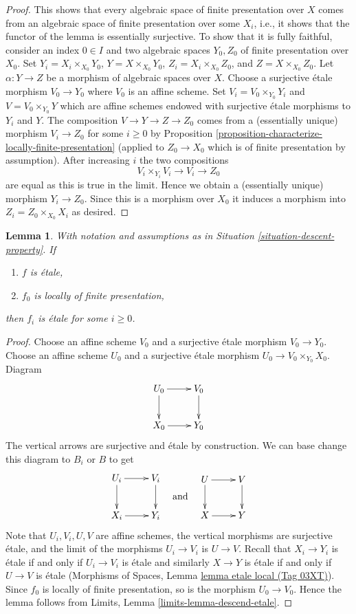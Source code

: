 \documentclass{amsart}
\theoremstyle{plain}
\newtheorem{lemma}[subsection]{Lemma}
\theoremstyle{definition}
\theoremstyle{remark}
\numberwithin{equation}{subsection}
\begin{document}
\begin{proof}
\medskip\noindent
This shows that every algebraic space of finite presentation over $X$ comes
from an algebraic space of finite presentation over some $X_i$, i.e.,
it shows that the functor of the lemma is essentially surjective. To
show that it is fully faithful, consider an index $0 \in I$ and two
algebraic spaces $Y_0, Z_0$ of finite presentation over $X_0$.
Set $Y_i = X_i \times_{X_0} Y_0$, $Y = X \times_{X_0} Y_0$,
$Z_i = X_i \times_{X_0} Z_0$, and $Z = X \times_{X_0} Z_0$. Let
$\alpha : Y \to Z$ be a morphism of algebraic spaces over $X$.
Choose a surjective \'etale morphism $V_0 \to Y_0$ where $V_0$ is
an affine scheme. Set $V_i = V_0 \times_{Y_0} Y_i$ and
$V = V_0 \times_{Y_0} Y$ which are affine schemes endowed with
surjective \'etale morphisms to $Y_i$ and $Y$. The composition
$V \to Y \to Z \to Z_0$ comes from a (essentially unique) morphism
$V_i \to Z_0$ for some $i \geq 0$ by
Proposition \ref{proposition-characterize-locally-finite-presentation}
(applied to $Z_0 \to X_0$ which is of finite presentation by assumption).
After increasing $i$ the two compositions
$$
V_i \times_{Y_i} V_i \to V_i \to Z_0
$$
are equal as this is true in the limit. Hence we obtain a (essentially unique)
morphism $Y_i \to Z_0$. Since this is a morphism over $X_0$
it induces a morphism into $Z_i = Z_0 \times_{X_0} X_i$ as desired.
\end{proof}


\begin{lemma}
\label{lemma-descend-etale}
With notation and assumptions as in
Situation \ref{situation-descent-property}. If
\begin{enumerate}
\item $f$ is \'etale,
\item $f_0$ is locally of finite presentation,
\end{enumerate}
then $f_i$ is \'etale for some $i \geq 0$.
\end{lemma}

\begin{proof}
Choose an affine scheme $V_0$ and a surjective \'etale morphism
$V_0 \to Y_0$. Choose an affine scheme $U_0$ and a surjective \'etale
morphism $U_0 \to V_0 \times_{Y_0} X_0$. Diagram
$$
\xymatrix{
U_0 \ar[d] \ar[r] & V_0 \ar[d] \\
X_0 \ar[r] & Y_0
}
$$
The vertical arrows are surjective and \'etale by construction.
We can base change this diagram to $B_i$ or $B$ to get
$$
\vcenter{
\xymatrix{
U_i \ar[d] \ar[r] & V_i \ar[d] \\
X_i \ar[r] & Y_i
}
}
\quad\text{and}\quad
\vcenter{
\xymatrix{
U \ar[d] \ar[r] & V \ar[d] \\
X \ar[r] & Y
}
}
$$
Note that $U_i, V_i, U, V$ are affine schemes,
the vertical morphisms are surjective \'etale, and the limit of the
morphisms $U_i \to V_i$ is $U \to V$. Recall that $X_i \to Y_i$ is \'etale
if and only if $U_i \to V_i$ is
\'etale and similarly $X \to Y$ is \'etale if and only if
$U \to V$ is \'etale
(Morphisms of Spaces, Lemma \href{https://stacks.math.columbia.edu/tag/03XT}{lemma etale local (Tag 03XT)}).
Since $f_0$ is locally of finite
presentation, so is the morphism $U_0 \to V_0$. Hence the lemma follows
from Limits, Lemma \ref{limits-lemma-descend-etale}.
\end{proof}
\end{document}
